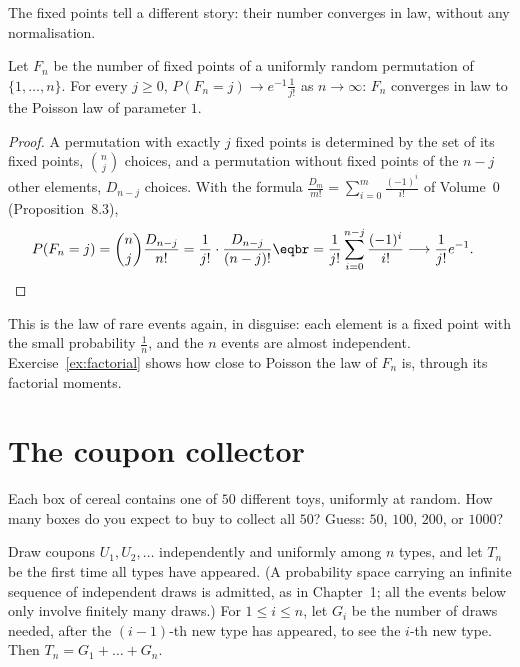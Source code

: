 The fixed points tell a different story: their number converges in law, without any normalisation.

\begin{theorem}\label{thm:fixedpoisson}
Let $F_n$ be the number of fixed points of a uniformly random permutation of $\{1,\dots,n\}$. For every $j\ge0$,
$P(F_n=j)\to e^{-1}\frac1{j!}$ as $n\to\infty$: $F_n$ converges in law to the Poisson law of parameter $1$.
\end{theorem}
\begin{proof}
A permutation with exactly $j$ fixed points is determined by the set of its fixed points, $\binom nj$ choices, and a
permutation without fixed points of the $n-j$ other elements, $D_{n-j}$ choices. With the formula
$\frac{D_m}{m!}=\sum_{i=0}^m\frac{(-1)^i}{i!}$ of Volume~0 (Proposition~8.3),
\[
\begin{aligned}P(F_n=j)&=\binom nj\frac{D_{n-j}}{n!}=\frac1{j!}\cdot\frac{D_{n-j}}{(n-j)!}\eqbr=\frac1{j!}\sum_{i=0}^{n-j}\frac{(-1)^i}{i!}\longrightarrow\frac1{j!}e^{-1}.\end{aligned}
\]
\end{proof}

This is the law of rare events again, in disguise: each element is a fixed point with the small probability $\frac1n$,
and the $n$ events are almost independent. Exercise~\ref{ex:factorial} shows how close to Poisson the law of $F_n$ is,
through its factorial moments.

\section{The coupon collector}

\begin{think}
Each box of cereal contains one of $50$ different toys, uniformly at random. How many boxes do you expect to buy
to collect all $50$? Guess: $50$, $100$, $200$, or $1000$?
\end{think}

Draw coupons $U_1,U_2,\ldots$ independently and uniformly among $n$ types, and let $T_n$ be the first time all
types have appeared. (A probability space carrying an infinite sequence of independent draws is admitted, as in
Chapter~1; all the events below only involve finitely many draws.) For $1\le i\le n$, let $G_i$ be the number of
draws needed, after the $(i-1)$-th new type has appeared, to see the $i$-th new type. Then $T_n=G_1+\dots+G_n$.

